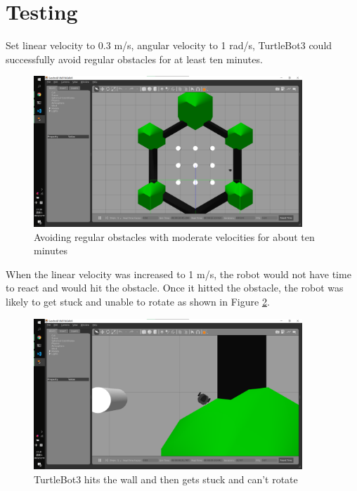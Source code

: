 \section{Testing}

Set linear velocity to 0.3 m/s, angular velocity to 1 rad/s, TurtleBot3 could successfully avoid regular obstacles for at least ten minutes.

\begin{figure}[htbp]
   \centering
   \includegraphics[width=0.9\textwidth]{figures/test_10min.png}
   \caption{Avoiding regular obstacles with moderate velocities for about ten minutes}
   \label{fig:test_10min}
\end{figure}

When the linear velocity was increased to 1 m/s, the robot would not have time to react and would hit the obstacle. Once it hitted the obstacle, the robot was likely to get stuck and unable to rotate as shown in Figure \ref{fig:test_high_linear_vel}.

\begin{figure}[htbp]
   \centering
   \includegraphics[width=0.9\textwidth]{figures/test_high_linear_vel.png}
   \caption{TurtleBot3 hits the wall and then gets stuck and can't rotate}
   \label{fig:test_high_linear_vel}
\end{figure}

